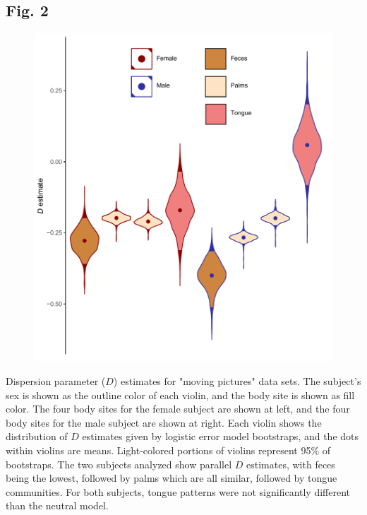 \documentclass{article}
\begin{document}
{\subsection{Fig. 2}\label{sec:figure2}
\begin{figure}[ht]
	\centering
	\includegraphics[scale=0.80]{figs/Fig_2.pdf}
\end{figure}
Dispersion parameter (\(D\)) estimates for "moving pictures" \cite{Caporaso2011} data sets. The subject’s sex is shown as the outline color of each violin, and the body site is shown as fill color. The four body sites for the female subject are shown at left, and the four body sites for the male subject are shown at right. Each violin shows the distribution of \(D\) estimates given by logistic error model bootstraps, and the dots within violins are means. Light-colored portions of violins represent 95\% of bootstraps. The two subjects analyzed show parallel \(D\) estimates, with feces being the lowest, followed by palms which are all similar, followed by tongue communities. For both subjects, tongue patterns were not significantly different than the neutral model.
\newpage

}
\end{document}

